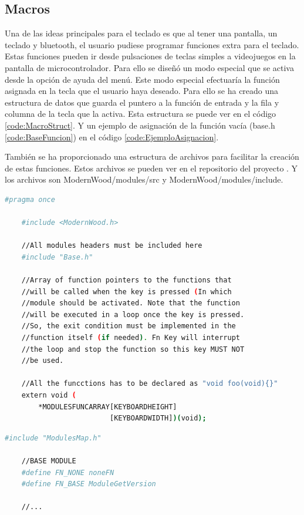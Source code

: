 \subsection{Macros}\label{ApendiceMacros}

Una de las ideas principales para el teclado es que al tener una pantalla, un teclado y bluetooth, el usuario pudiese programar funciones extra para el teclado. Estas funciones pueden ir desde pulsaciones de teclas simples a videojuegos en la pantalla de microcontrolador. Para ello se diseñó un modo especial que se activa desde la opción de ayuda del menú.
Este modo especial efectuaría la función asignada en la tecla que el usuario haya deseado. Para ello se ha creado una estructura de datos que guarda el puntero a la función de entrada y la fila y columna de la tecla que la activa. Esta estructura se puede ver en el código \ref{code:MacroStruct}. Y un ejemplo de asignación de la función vacía (base.h \ref{code:BaseFuncion}) en el código \ref{code:EjemploAsignacion}.

También se ha proporcionado una estructura de archivos para facilitar la creación de estas funciones. Estos archivos se pueden ver en el repositorio del proyecto \cite{ModernWoodGitHub}. Y los archivos son ModernWood/modules/src y ModernWood/modules/include.

\begin{lstlisting}[style=console, language=bash, caption={Estructura que contiene las funciones en Modulesmap.h}, label={code:MacroStruct}]
    #pragma once

    #include <ModernWood.h>
    
    //All modules headers must be included here
    #include "Base.h"
    
    //Array of function pointers to the functions that 
    //will be called when the key is pressed (In which 
    //module should be activated. Note that the function 
    //will be executed in a loop once the key is pressed. 
    //So, the exit condition must be implemented in the 
    //function itself (if needed). Fn Key will interrupt 
    //the loop and stop the function so this key MUST NOT 
    //be used.

    //All the funcctions has to be declared as "void foo(void){}"
    extern void (
        *MODULESFUNCARRAY[KEYBOARDHEIGHT]
                         [KEYBOARDWIDTH])(void);
\end{lstlisting}

\begin{lstlisting}[style=console, language=bash, caption={Ejemplo de asignación a una tecla en el archivo ModernWood/modules/src/ModulesMap.cpp}, label={code:EjemploAsignacion}]
    #include "ModulesMap.h"

    //BASE MODULE
    #define FN_NONE noneFN
    #define FN_BASE ModuleGetVersion

    //...
\end{lstlisting}

